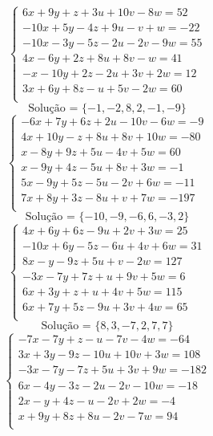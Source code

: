 \documentclass[12pt,oneside,a4paper]{article}
\begin{document}
\vspace{\baselineskip}
\begin{equation*}
\begin{cases}
6x+9y+z+3u+10v-8w=52 \\
-10x+5y-4z+9u-v+w=-22 \\
-10x-3y-5z-2u-2v-9w=55 \\
4x-6y+2z+8u+8v-w=41 \\
-x-10y+2z-2u+3v+2w=12 \\
3x+6y+8z-u+5v-2w=60 \\
\end{cases}
\end{equation*}
\begin{equation*}
\text{Solução = }\{-1,-2,8,2,-1,-9\}
\end{equation*}
\vspace{\baselineskip}
\begin{equation*}
\begin{cases}
-6x+7y+6z+2u-10v-6w=-9 \\
4x+10y-z+8u+8v+10w=-80 \\
x-8y+9z+5u-4v+5w=60 \\
x-9y+4z-5u+8v+3w=-1 \\
5x-9y+5z-5u-2v+6w=-11 \\
7x+8y+3z-8u+v+7w=-197 \\
\end{cases}
\end{equation*}
\begin{equation*}
\text{Solução = }\{-10,-9,-6,6,-3,2\}
\end{equation*}
\vspace{\baselineskip}
\begin{equation*}
\begin{cases}
4x+6y+6z-9u+2v+3w=25 \\
-10x+6y-5z-6u+4v+6w=31 \\
8x-y-9z+5u+v-2w=127 \\
-3x-7y+7z+u+9v+5w=6 \\
6x+3y+z+u+4v+5w=115 \\
6x+7y+5z-9u+3v+4w=65 \\
\end{cases}
\end{equation*}
\begin{equation*}
\text{Solução = }\{8,3,-7,2,7,7\}
\end{equation*}
\vspace{\baselineskip}
\begin{equation*}
\begin{cases}
-7x-7y+z-u-7v-4w=-64 \\
3x+3y-9z-10u+10v+3w=108 \\
-3x-7y-7z+5u+3v+9w=-182 \\
6x-4y-3z-2u-2v-10w=-18 \\
2x-y+4z-u-2v+2w=-4 \\
x+9y+8z+8u-2v-7w=94 \\
\end{cases}
\end{equation*}
\end{document}
